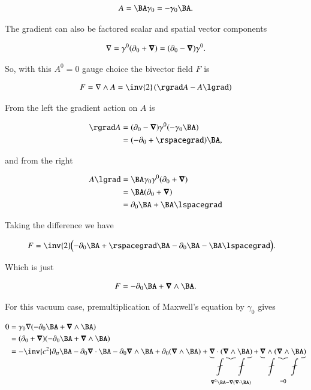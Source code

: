 \begin{align}\label{eqn:fourierMaxVac:41}
A = \BA \gamma_0 = -\gamma_0 \BA.
\end{align}

The gradient can also be factored scalar and spatial vector components

\begin{align}\label{eqn:fourierMaxVac:42}
\nabla = \gamma^0 ( \partial_0 + \boldsymbol{\nabla} ) = ( \partial_0 - \boldsymbol{\nabla} ) \gamma^0.
\end{align}

So, with this $A^0 = 0$ gauge choice the bivector field $F$ is

\begin{align}\label{eqn:fourierMaxVac:43}
F = \grad \wedge A = \inv{2} \left( \rgrad A - A \lgrad \right) 
\end{align}

From the left the gradient action on $A$ is

\begin{align*}
\rgrad A 
&= ( \partial_0 - \spacegrad ) \gamma^0 (-\gamma_0 \BA) \\
&= ( -\partial_0 + \rspacegrad ) \BA,
\end{align*}

and from the right

\begin{align*}
A \lgrad
&= 
\BA \gamma_0 \gamma^0 ( \partial_0 + \spacegrad ) \\
&= 
\BA ( \partial_0 + \spacegrad ) \\
&= 
\partial_0 \BA 
+ \BA \lspacegrad 
\end{align*}

Taking the difference we have

\begin{align*}
F 
&= 
\inv{2} \Bigl( -\partial_0 \BA + \rspacegrad \BA -  \partial_0 \BA - \BA \lspacegrad \Bigr).
\end{align*}

Which is just

\begin{align}\label{eqn:fourierMaxVac:44}
F = -\partial_0 \BA + \spacegrad \wedge \BA.
\end{align}

For this vacuum case, premultiplication of Maxwell's equation by $\gamma_0$ gives

\begin{align*}
0 
&= \gamma_0 \grad ( -\partial_0 \BA + \spacegrad \wedge \BA ) \\
&= (\partial_0 + \spacegrad)( -\partial_0 \BA + \spacegrad \wedge \BA ) \\
&= -\inv{c^2} \partial_{tt} \BA 
- \partial_0 \spacegrad \cdot \BA 
- \partial_0 \spacegrad \wedge \BA 
+ \partial_0 ( \spacegrad \wedge \BA ) 
+ \underbrace{\spacegrad \cdot ( \spacegrad \wedge \BA ) }_{\spacegrad^2 \BA - \spacegrad (\spacegrad \cdot \BA)}
+ \underbrace{\spacegrad \wedge ( \spacegrad \wedge \BA )}_{=0} \\
\end{align*}


